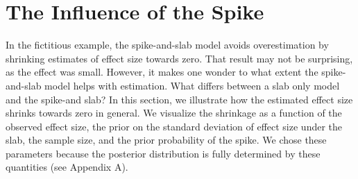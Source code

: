 \documentclass[a4paper]{article}
\newenvironment{revision}{\color{teal}}{\color{black}}
\begin{document}
\begin{revision}%
\section*{The Influence of the Spike}

In the fictitious example, the spike-and-slab model avoids overestimation by shrinking estimates of effect size towards zero.
That result may not be surprising, as the effect was small.
However, it makes one wonder to what extent the spike-and-slab model helps with estimation.
What differs between a slab only model and the spike-and slab?
In this section, we illustrate how the estimated effect size shrinks towards zero in general. 
We visualize the shrinkage as a function of the observed effect size, the prior on the standard deviation of effect size under the slab, the sample size, and the prior probability of the spike.
We chose these parameters because the posterior distribution is fully determined by these quantities (see Appendix A).


\end{revision}
\end{document}
